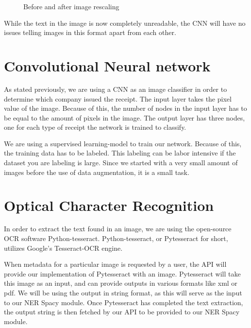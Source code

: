 \begin{figure}[h]
    \caption{Before and after image rescaling}
    \label{fig:figure3.3}
\end{figure}
While the text in the image is now completely unreadable, the CNN will have no issues telling images in this format apart from each other.

\section{Convolutional Neural network}\label{sec:CNN}
As stated previously, we are using a CNN as an image classifier in order to determine which company issued the receipt.
The input layer takes the pixel value of the image.
Because of this, the number of nodes in the input layer has to be equal to the amount of pixels in the image.
The output layer has three nodes, one for each type of receipt the network is trained to classify.

We are using a supervised learning-model to train our network.
Because of this, the training data has to be labeled.
This labeling can be labor intensive if the dataset you are labeling is large.
Since we started with a very small amount of images before the use of data augmentation, it is a small task.

\section{Optical Character Recognition}\label{sec:OCR}
In order to extract the text found in an image, we are using the open-source OCR software Python-tesseract.
Python-tesseract, or Pytesseract for short, utilizes Google's Tesseract-OCR engine.

When metadata for a particular image is requested by a user, the API will provide our implementation of Pytesseract with an image.
Pytesseract will take this image as an input, and can provide outputs in various formats like xml or pdf.
We will be using the output in string format, as this will serve as the input to our NER Spacy module.
Once Pytesseract has completed the text extraction, the output string is then fetched by our API to be provided to our NER Spacy module.


